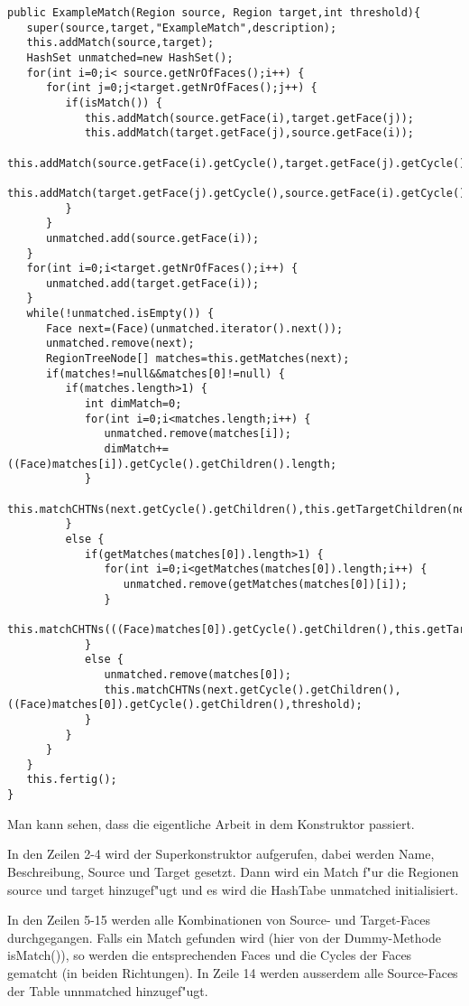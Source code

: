 \begin{lstlisting}
public ExampleMatch(Region source, Region target,int threshold){
   super(source,target,"ExampleMatch",description);
   this.addMatch(source,target);
   HashSet unmatched=new HashSet();
   for(int i=0;i< source.getNrOfFaces();i++) {
      for(int j=0;j<target.getNrOfFaces();j++) {                         
         if(isMatch()) {
            this.addMatch(source.getFace(i),target.getFace(j));
            this.addMatch(target.getFace(j),source.getFace(i));
            this.addMatch(source.getFace(i).getCycle(),target.getFace(j).getCycle());
            this.addMatch(target.getFace(j).getCycle(),source.getFace(i).getCycle());
         }
      }
      unmatched.add(source.getFace(i));
   }
   for(int i=0;i<target.getNrOfFaces();i++) {
      unmatched.add(target.getFace(i));
   }
   while(!unmatched.isEmpty()) {
      Face next=(Face)(unmatched.iterator().next());
      unmatched.remove(next);
      RegionTreeNode[] matches=this.getMatches(next);
      if(matches!=null&&matches[0]!=null) {
         if(matches.length>1) {
            int dimMatch=0;
            for(int i=0;i<matches.length;i++) {
               unmatched.remove(matches[i]);
               dimMatch+=((Face)matches[i]).getCycle().getChildren().length;
            }
            this.matchCHTNs(next.getCycle().getChildren(),this.getTargetChildren(next),threshold);
         }
         else {
            if(getMatches(matches[0]).length>1) {
               for(int i=0;i<getMatches(matches[0]).length;i++) {
                  unmatched.remove(getMatches(matches[0])[i]);
               }
               this.matchCHTNs(((Face)matches[0]).getCycle().getChildren(),this.getTargetChildren(matches[0]),threshold);
            }
            else {
               unmatched.remove(matches[0]);
               this.matchCHTNs(next.getCycle().getChildren(),((Face)matches[0]).getCycle().getChildren(),threshold);
            }
         }
      }
   }
   this.fertig();
}
\end{lstlisting}
Man kann sehen, dass die eigentliche Arbeit in dem Konstruktor passiert. 

In den Zeilen 2-4 wird der Superkonstruktor aufgerufen, dabei werden Name, Beschreibung, Source und Target gesetzt. Dann wird ein Match f"ur die Regionen source und target hinzugef"ugt und es wird die HashTabe unmatched initialisiert.

In den Zeilen 5-15 werden alle Kombinationen von Source- und Target-Faces durchgegangen. Falls ein Match gefunden wird (hier von der Dummy-Methode isMatch()), so werden die entsprechenden Faces und die Cycles der Faces gematcht (in beiden Richtungen). In Zeile 14 werden ausserdem alle Source-Faces der Table unnmatched hinzugef"ugt.


